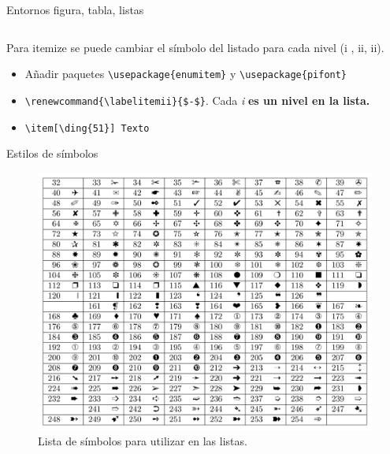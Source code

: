 \documentclass[aspectratio=169, 10pt]{beamer}
\begin{document}
\begin{frame}[fragile]{Entornos figura, tabla, listas}
\begin{columns}
\begin{column}{.48\linewidth}
    \end{column}
  
\end{columns}

\begin{alertblock}{Para itemize se puede cambiar el símbolo del listado para cada nivel (i , ii, ii).}
\begin{itemize}
    \item Añadir paquetes \verb|\usepackage{enumitem}| y \verb|\usepackage{pifont}|
    \item \verb|\renewcommand{\labelitemii}{$-$}|. Cada \textit{i} \textbf{es un nivel en la lista.}
    \item \verb|\item[\ding{51}] Texto| %
    
    
    
\end{itemize}
    
\end{alertblock}
\end{frame}


\begin{frame}{Estilos de símbolos}
    \begin{figure}[H]
        \centering
        \includegraphics[scale=.25]{pifont.png} 
        \caption{Lista de símbolos para utilizar en las listas.}
        \label{fig:enter-label}
    \end{figure}
\end{frame}
\end{document}
